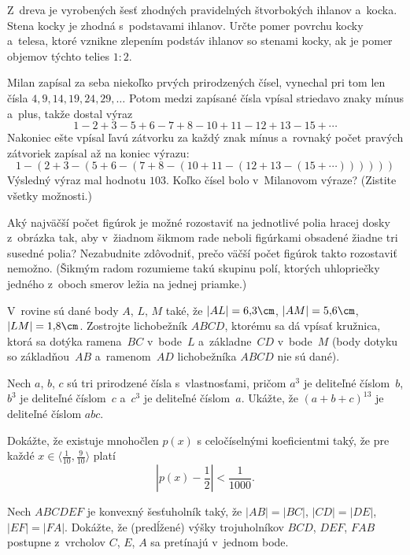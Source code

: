 {%
Z~dreva je vyrobených šesť zhodných pravidelných štvorbokých
ihlanov a~kocka. Stena kocky je zhodná s~podstavami ihlanov.
Určte pomer povrchu kocky a~telesa, ktoré vznikne zlepením
podstáv ihlanov so stenami kocky, ak je pomer objemov týchto
telies $1:2$.}

{%
Milan zapísal za seba niekoľko prvých prirodzených čísel,
vynechal pri tom len čísla $4, 9, 14, 19, 24, 29, \dots$ Potom medzi
zapísané čísla vpísal striedavo znaky mínus a~plus, takže dostal
výraz
$$
1-2+3-5+6-7+8-10+11-12+13-15+\cdots
$$
Nakoniec ešte vpísal ľavú zátvorku za každý znak mínus a~rovnaký
počet pravých zátvoriek zapísal až na koniec výrazu:
$$
1-(2+3-(5+6-(7+8-(10+11-(12+13-(15+\cdots))))))
$$
Výsledný výraz mal hodnotu $103$. Koľko čísel bolo v~Milanovom výraze?
(Zistite všetky možnosti.)}

{%
Aký najväčší počet figúrok je možné rozostaviť na jednotlivé polia
hracej dosky z~obrázka tak, aby v~žiadnom šikmom rade neboli
figúrkami obsadené žiadne tri susedné polia? Nezabudnite
zdôvodniť, prečo väčší počet figúrok takto rozostaviť nemožno.
(Šikmým radom rozumieme takú skupinu polí, ktorých uhlopriečky
jedného z~oboch smerov ležia na jednej priamke.)
}

{%
V~rovine sú dané body $A$, $L$, $M$ také, že $|AL|=6{,}3\cm$,
$|AM|=5{,}6\cm$, $|LM|=1{,}8\cm$. Zostrojte lichobežník $ABCD$,
ktorému sa dá vpísať kružnica, ktorá sa dotýka ramena~$BC$ v~bode~$L$
a~základne~$CD$ v~bode~$M$ (body dotyku so základňou~$AB$ a~ramenom~$AD$
lichobežníka $ABCD$ nie sú dané).}

{%
Nech $a$, $b$, $c$ sú tri prirodzené čísla s~vlastnosťami, pričom
$a^3$ je deliteľné číslom~$b$, $b^3$ je deliteľné číslom~$c$ a~$c^3$ je deliteľné číslom~$a$.
Ukážte, že $(a+b+c)^{13}$ je deliteľné číslom $abc$.}

{%
Dokážte, že existuje mnohočlen $p(x)$ s celočíselnými
koeficientmi taký, že pre každé $x\in\langle\frac1{10}, \frac9{10}\rangle$
platí
$$
\left|p(x) - \frac12\right| < \frac1{1000}.
$$}

{%
Nech $ABCDEF$ je konvexný šesťuholník taký, že
$|AB|=|BC|$,
$|CD|=|DE|$,
$|EF|=|FA|$. Dokážte, že (predĺžené) výšky trojuholníkov
$BCD$, $DEF$, $FAB$ postupne z~vrcholov $C$, $E$,
$A$ sa pretínajú v~jednom bode.}

